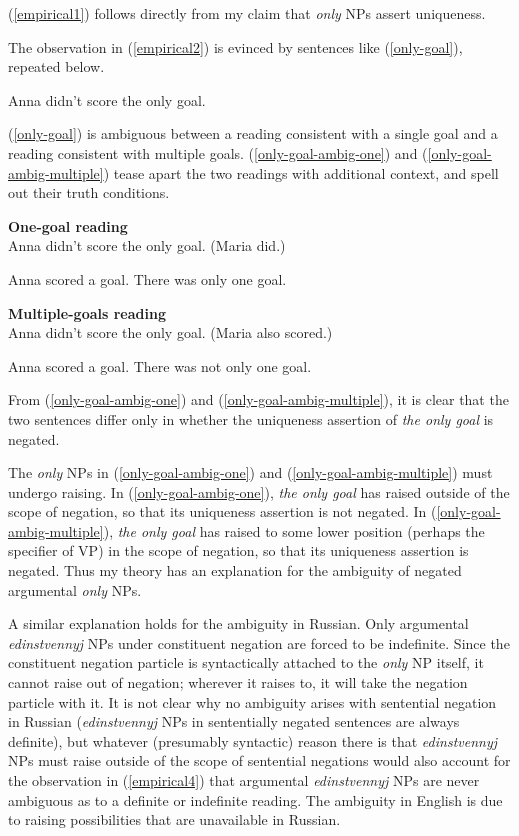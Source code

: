 (\ref{empirical1}) follows directly from my claim that \textit{only} NPs assert uniqueness.

The observation in (\ref{empirical2}) is evinced by sentences like (\ref{only-goal}), repeated below.

\begin{exe}
	 Anna didn't score the only goal.
\end{exe}

(\ref{only-goal}) is ambiguous between a reading consistent with a single goal and a reading consistent with multiple goals. (\ref{only-goal-ambig-one}) and (\ref{only-goal-ambig-multiple}) tease apart the two readings with additional context, and spell out their truth conditions.

\begin{exe}
	\ex \label{only-goal-ambig-one} \textbf{One-goal reading} \\ Anna didn't score the only goal. (Maria did.)
	\begin{xlist}
		\ex Anna scored a goal.
		\ex There was only one goal.
	\end{xlist}

	\ex \label{only-goal-ambig-multiple} \textbf{Multiple-goals reading} \\ Anna didn't score the only goal. (Maria also scored.)
	\begin{xlist}
		\ex Anna scored a goal.
		\ex There was not only one goal.
	\end{xlist}
\end{exe}

From (\ref{only-goal-ambig-one}) and (\ref{only-goal-ambig-multiple}), it is clear that the two sentences differ only in whether the uniqueness assertion of \textit{the only goal} is negated.

The \textit{only} NPs in (\ref{only-goal-ambig-one}) and (\ref{only-goal-ambig-multiple}) must undergo raising. In (\ref{only-goal-ambig-one}), \textit{the only goal} has raised outside of the scope of negation, so that its uniqueness assertion is not negated. In (\ref{only-goal-ambig-multiple}), \textit{the only goal} has raised to some lower position (perhaps the specifier of VP) in the scope of negation, so that its uniqueness assertion is negated. Thus my theory has an explanation for the ambiguity of negated argumental \textit{only} NPs.

A similar explanation holds for the ambiguity in Russian. Only argumental \textit{edinstvennyj} NPs under constituent negation are forced to be indefinite. Since the constituent negation particle is syntactically attached to the \textit{only} NP itself, it cannot raise out of negation; wherever it raises to, it will take the negation particle with it. It is not clear why no ambiguity arises with sentential negation in Russian (\textit{edinstvennyj} NPs in sententially negated sentences are always definite), but whatever (presumably syntactic) reason there is that \textit{edinstvennyj} NPs must raise outside of the scope of sentential negations would also account for the observation in (\ref{empirical4}) that argumental \textit{edinstvennyj} NPs are never ambiguous as to a definite or indefinite reading. The ambiguity in English is due to raising possibilities that are unavailable in Russian.

